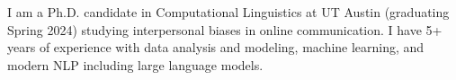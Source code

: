 I am a Ph.D. candidate in Computational Linguistics at UT Austin (graduating Spring 2024) studying interpersonal biases in online communication. I have 5+ years of experience with data analysis and modeling, machine learning, and modern NLP including large language models.
%

